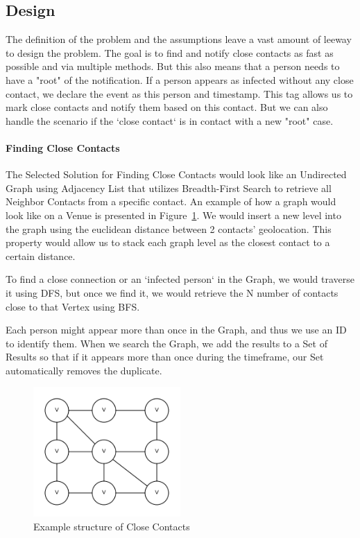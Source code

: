 \documentclass{article}
\begin{document}
\subsection{Design}

The definition of the problem and the assumptions leave a vast amount of leeway to design the problem. The goal is to find and notify close contacts as fast as possible and via multiple methods. But this also means that a person needs to have a "root" of the notification. If a person appears as infected without any close contact, we declare the event as this person and timestamp. This tag allows us to mark close contacts and notify them based on this contact. But we can also handle the scenario if the `close contact` is in contact with a new "root" case.

\paragraph{Finding Close Contacts}

The Selected Solution for Finding Close Contacts would look like an Undirected Graph using Adjacency List that utilizes Breadth-First Search to retrieve all Neighbor Contacts from a specific contact. An example of how a graph would look like on a Venue is presented in Figure~\ref{fig:closeContacts}. We would insert a new level into the graph using the euclidean distance between 2 contacts' geolocation. This property would allow us to stack each graph level as the closest contact to a certain distance. 

To find a close connection or an `infected person` in the Graph, we would traverse it using DFS, but once we find it, we would retrieve the N number of contacts close to that Vertex using BFS. 

Each person might appear more than once in the Graph, and thus we use an ID to identify them. When we search the Graph, we add the results to a Set of Results so that if it appears more than once during the timeframe, our Set automatically removes the duplicate.

\begin{figure}[h!]
  \centering
  \captionsetup{justification=centering}
  \includegraphics[width=0.5\textwidth]{graph.png}
  \caption{
    Example structure of Close Contacts
  }%
  \label{fig:closeContacts}%
\end{figure}
\end{document}
